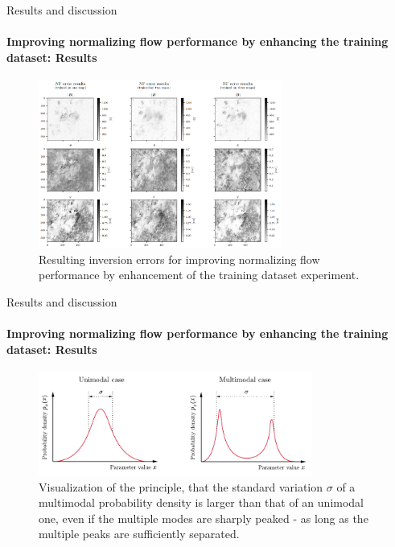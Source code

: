 \documentclass{beamer}
\begin{document}
\begin{frame}[allowframebreaks]{Results and discussion}
	\framesubtitle{Improving normalizing flow performance by enhancing the training dataset: Results} %
\begin{figure}[h!]
	\centering
	\includegraphics[width=8cm]{figures/presentation/exp5_fig2.png}
	\caption{Resulting inversion errors for improving normalizing flow performance by enhancement of the training dataset experiment.}
	\label{fig:exp5_fig2}
\end{figure}
\end{frame}

\begin{frame}[allowframebreaks]{Results and discussion}
	\framesubtitle{Improving normalizing flow performance by enhancing the training dataset: Results} %
\begin{figure}[h!] %
	\centering
	\includegraphics[width=0.8\textwidth]{figures/thesis/unimodal_multimodal.pdf}
	\caption{Visualization of the principle, that the standard variation $\sigma$ of a multimodal probability density is larger than that of an unimodal one, even if the multiple modes are sharply peaked - as long as the multiple peaks are sufficiently separated.}
	\label{fig:unimodal_multimodal}
\end{figure}
\end{frame}
\end{document}
